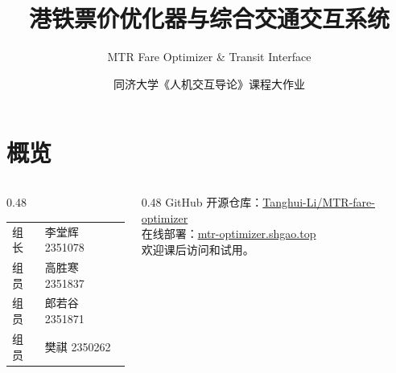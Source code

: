 \documentclass[aspectratio=169,10pt]{beamer}
\title{港铁票价优化器与综合交通交互系统}
\subtitle{MTR Fare Optimizer \& Transit Interface}
\author{同济大学《人机交互导论》课程大作业}
\date{}
\begin{document}
\section{概览}
\begin{frame}
  \titlepage
  \vspace{-1.2em}
  \begin{columns}[T,onlytextwidth]
    \begin{column}{0.48\textwidth}
      \small
      \begin{tabular}{ll}
        组长 & 李堂辉 2351078 \\
        组员 & 高胜寒 2351837 \\
        组员 & 郎若谷 2351871 \\
        组员 & 樊祺 2350262 \\
      \end{tabular}
    \end{column}
    \begin{column}{0.48\textwidth}
      \small
      GitHub 开源仓库：\href{https://github.com/Tanghui-Li/MTR-fare-optimizer/}{Tanghui-Li/MTR-fare-optimizer}\\
      在线部署：\href{https://mtr-optimizer.shgao.top}{mtr-optimizer.shgao.top}\\
      欢迎课后访问和试用。\\[0.6em]
    \end{column}
  \end{columns}
\end{frame}
\end{document}
